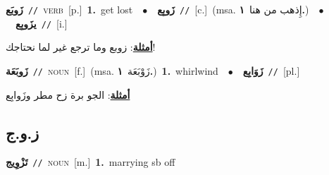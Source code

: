 \documentclass[10pt,a4paper,twoside]{article} %
\begin{document}
\begin{multicols}{2}
{\setlength\topsep{0pt}\textbf{\foreignlanguage{arabic}{زَوبَع}}\ {\color{gray}\texttt{//}\color{black}}\ \textsc{verb}\ [p.]\ \textbf{1.}~get lost\ \ $\bullet$\ \ \setlength\topsep{0pt}\textbf{\foreignlanguage{arabic}{زَوبِع}}\ {\color{gray}\texttt{//}\color{black}}\ [c.]\ \color{gray}(msa. \foreignlanguage{arabic}{إِذهب من هنا}~\foreignlanguage{arabic}{\textbf{١.}})\color{black}\ \ $\bullet$\ \ \setlength\topsep{0pt}\textbf{\foreignlanguage{arabic}{يزَوبِع}}\ {\color{gray}\texttt{//}\color{black}}\ [i.]\  \begin{flushright}\color{gray}\foreignlanguage{arabic}{\textbf{\underline{\foreignlanguage{arabic}{أمثلة}}}: زوبع وما ترجع غير لما نحتاجك!}\end{flushright}\color{black}} \vspace{2mm}

{\setlength\topsep{0pt}\textbf{\foreignlanguage{arabic}{زَوبَعَة}}\ {\color{gray}\texttt{//}\color{black}}\ \textsc{noun}\ [f.]\ \color{gray}(msa. \foreignlanguage{arabic}{زَوْبَعَة}~\foreignlanguage{arabic}{\textbf{١.}})\color{black}\ \textbf{1.}~whirlwind\ \ $\bullet$\ \ \setlength\topsep{0pt}\textbf{\foreignlanguage{arabic}{زَوَابِع}}\ {\color{gray}\texttt{//}\color{black}}\ [pl.]\  \begin{flushright}\color{gray}\foreignlanguage{arabic}{\textbf{\underline{\foreignlanguage{arabic}{أمثلة}}}: الجو برة زح مطر وزَوابِع}\end{flushright}\color{black}} \vspace{2mm}

\vspace{-3mm}
\subsection*{\color{blue}\foreignlanguage{arabic}{ز.و.ج}\color{blue}{}} 

{\setlength\topsep{0pt}\textbf{\foreignlanguage{arabic}{تَزْوِيج}}\ {\color{gray}\texttt{//}\color{black}}\ \textsc{noun}\ [m.]\ \textbf{1.}~marrying sb off\ } \vspace{2mm}


\end{multicols}
\end{document}
